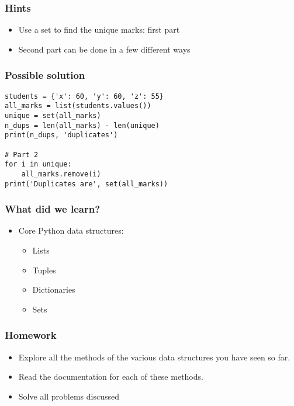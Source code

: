 \documentclass[14pt,compress]{beamer}
\begin{document}
\begin{frame}
  \frametitle{Hints}
  \begin{itemize}
  \item Use a set to find the unique marks: first part
  \item Second part can be done in a few different ways
  \end{itemize}
\end{frame}

\begin{frame}[fragile]
  \frametitle{Possible solution}
\begin{lstlisting}
students = {'x': 60, 'y': 60, 'z': 55}
all_marks = list(students.values())
unique = set(all_marks)
n_dups = len(all_marks) - len(unique)
print(n_dups, 'duplicates')

# Part 2
for i in unique:
    all_marks.remove(i)
print('Duplicates are', set(all_marks))
\end{lstlisting}
\end{frame}

\begin{frame}
  \frametitle{What did we learn?}
  \begin{itemize}
    \item Core Python data structures:
    \begin{itemize}
      \item Lists
      \item Tuples
      \item Dictionaries
      \item Sets
    \end{itemize}
  \end{itemize}
\end{frame}

\begin{frame}
  \frametitle{Homework}

  \begin{itemize}
  \item Explore all the methods of the various data structures you have seen
    so far.
  \item Read the documentation for each of these methods.
  \item Solve all problems discussed
  \end{itemize}
\end{frame}
\end{document}
